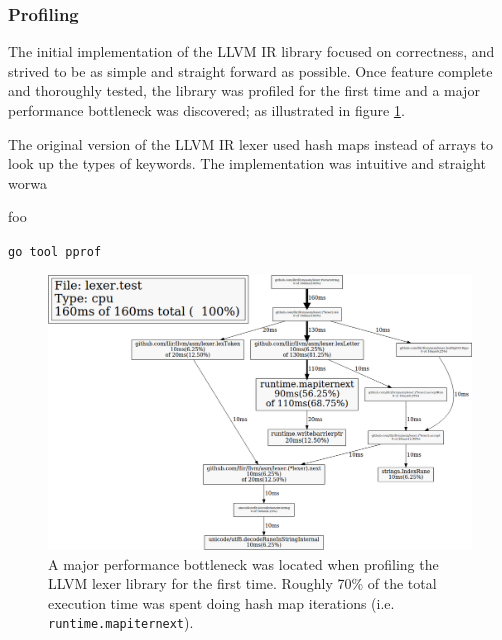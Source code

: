 
\subsubsection{Profiling}
\label{sec:ver_profiling}


The initial implementation of the LLVM IR library focused on correctness, and strived to be as simple and straight forward as possible. Once feature complete and thoroughly tested, the library was profiled for the first time and a major performance bottleneck was discovered; as illustrated in figure \ref{fig:lexer_pprof}.

The original version of the LLVM IR lexer used hash maps instead of arrays to look up the types of keywords. The implementation was intuitive and straight worwa

foo

\texttt{go tool pprof}

\begin{figure}[htbp]
	\begin{center}
		\includegraphics[width=\textwidth]{inc/8_ver/lexer_pprof.png}
		\caption{A major performance bottleneck was located when profiling the LLVM lexer library for the first time. Roughly 70\% of the total execution time was spent doing hash map iterations (i.e. \texttt{runtime.mapiternext}).}
		\label{fig:lexer_pprof}
	\end{center}
\end{figure}
